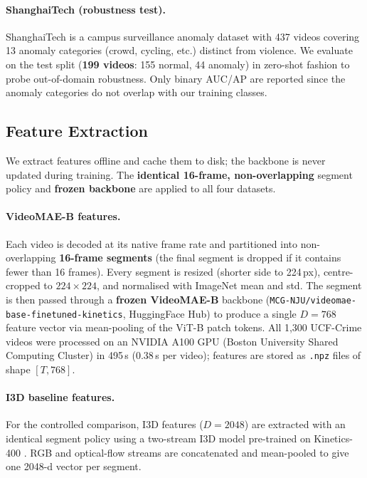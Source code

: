 \documentclass[11pt]{article}
\begin{document}
\paragraph{ShanghaiTech (robustness test).}
ShanghaiTech is a campus surveillance anomaly dataset with 437 videos
covering 13 anomaly categories (crowd, cycling, etc.) distinct from violence.
We evaluate on the test split (\textbf{199 videos}: 155 normal, 44 anomaly)
in zero-shot fashion to probe out-of-domain robustness.
Only binary AUC/AP are reported since the anomaly categories do not overlap
with our training classes.

\subsection{Feature Extraction}

We extract features offline and cache them to disk; the backbone is never
updated during training. The \textbf{identical 16-frame, non-overlapping}
segment policy and \textbf{frozen backbone} are applied to all four datasets.

\paragraph{VideoMAE-B features.}
Each video is decoded at its native frame rate and partitioned into
non-overlapping \textbf{16-frame segments} (the final segment is dropped
if it contains fewer than 16 frames).
Every segment is resized (shorter side to 224\,px), centre-cropped to
$224{\times}224$, and normalised with ImageNet mean and std.
The segment is then passed through a \textbf{frozen VideoMAE-B} backbone
(\texttt{MCG-NJU/videomae-base-finetuned-kinetics}, HuggingFace Hub) to
produce a single $D{=}768$ feature vector via mean-pooling of the ViT-B
patch tokens.
All 1,300 UCF-Crime videos were processed on an NVIDIA A100 GPU
(Boston University Shared Computing Cluster) in 495\,s
(0.38\,s per video); features are stored as \texttt{.npz} files of shape
$[T, 768]$.

\paragraph{I3D baseline features.}
For the controlled comparison, I3D features ($D{=}2048$) are extracted
with an identical segment policy using a two-stream I3D model pre-trained
on Kinetics-400 \citep{carreira2017quo}.
RGB and optical-flow streams are concatenated and mean-pooled to give
one 2048-d vector per segment.
\end{document}
